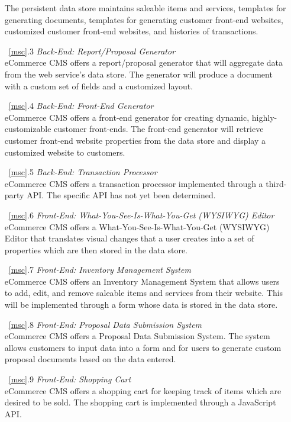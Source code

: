 \documentclass{article}
\newcommand{\br}{\vspace{2mm}}
\begin{document}
\begin{enumerate}
        The persistent data store maintains saleable items and services, templates
        for generating documents, templates for generating customer front-end
        websites, customized customer front-end websites, and histories of
        transactions.
    \item[~\ref{msc}.3 ] \emph{Back-End: Report/Proposal Generator}\br\\
        eCommerce CMS offers a report/proposal generator that will aggregate
        data from the web service's data store.  The generator will produce a
        document with a custom set of fields and a customized layout.
    \item[~\ref{msc}.4 ] \emph{Back-End: Front-End Generator}\br\\
        eCommerce CMS offers a front-end generator for creating dynamic, highly-
        customizable customer front-ends.  The front-end generator will retrieve
        customer front-end website properties from the data store and display
        a customized website to customers.
    \item[~\ref{msc}.5 ] \emph{Back-End: Transaction Processor}\br\\
        eCommerce CMS offers a transaction processor implemented through a
        third-party API.  The specific API has not yet been determined.
    \item[~\ref{msc}.6 ] \emph{Front-End: What-You-See-Is-What-You-Get (WYSIWYG) Editor}\br\\
        eCommerce CMS offers a What-You-See-Is-What-You-Get (WYSIWYG) Editor that
        translates visual changes that a user creates into a set of properties
        which are then stored in the data store.
    \item[~\ref{msc}.7 ] \emph{Front-End: Inventory Management System}\br\\
        eCommerce CMS offers an Inventory Management System that allows users to
        add, edit, and remove saleable items and services from their website.  This
        will be implemented through a form whose data is stored in the data
        store.
    \item[~\ref{msc}.8 ] \emph{Front-End: Proposal Data Submission System}\br\\
        eCommerce CMS offers a Proposal Data Submission System.  The system
        allows customers to input data into a form and for users to generate
        custom proposal documents based on the data entered.
    \item[~\ref{msc}.9 ] \emph{Front-End: Shopping Cart}\br\\
        eCommerce CMS offers a shopping cart for keeping track of items which
        are desired to be sold.  The shopping cart is implemented through a
        JavaScript API.
\end{enumerate}
\end{document}
